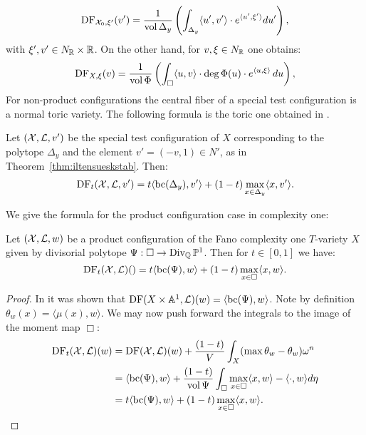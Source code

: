 \begin{equation}
\mathop{\rm DF}\nolimits_{{\mathcal{X}}_0, \xi'}(v') = \frac{1}{\mathop{\rm vol}\nolimits \Delta_y}\left(\int_{\Delta_y} \langle u', v' \rangle \cdot e^{\langle u', \xi'\rangle} du'\right),\label{eq:futaki-character}
\end{equation}
with $\xi',v' \in N_{\mathbb{R}} \times \mathbb{R}$. On the other hand, for $v,\xi \in N_{\mathbb{R}}$ one obtains:
\begin{equation}
\mathop{\rm DF}\nolimits_{X, \xi}(v) = \frac{1}{\mathop{\rm vol}\nolimits \Phi }\left(\int_{\Box} \langle u, v \rangle \cdot \deg \Phi(u) \cdot e^{\langle u, \xi \rangle}\, du\right)
, \label{eq:futaki-general-fibre}
\end{equation}
For non-product configurations the central fiber of a special test configuration is a normal toric variety. The following formula is the toric one obtained in \cite{datar2016kahler}.
\begin{lemma} Let \(({\mathcal{X}},\mathcal{L},v')\) be the special test configuration of \(X\) corresponding to the polytope \(\Delta_y\) and the element \(v' = (-v,1) \in N'\), as in Theorem~\ref{thm:iltensueskstab}. Then:
\[
\mathop{\rm DF}\nolimits_t( {\mathcal{X}}, \mathcal{L},v')  = t \langle \mathop{\rm bc}\nolimits(\Delta_y), v' \rangle + (1-t) \max_{x \in \Delta_y} \langle x, v' \rangle.
\]
\end{lemma}
We give the formula for the product configuration case in complexity one:
\begin{lemma}
Let \(({\mathcal{X}},\mathcal{L},w)\) be a product configuration of the Fano complexity one \(T\)-variety \(X\) given by divisorial polytope \(\Psi: \Box \to \operatorname{Div}_{\mathbb{Q}} \mathbb{P}^1\). Then for \(t \in [0,1]\) we have:
\[
\mathop{\rm DF}\nolimits_t({\mathcal{X}},\mathcal{L})() = t \langle  \mathop{\rm bc}\nolimits(\Psi), w \rangle + (1-t)\max_{x \in \Box} \langle x,w \rangle.
\]
\end{lemma}
\begin{proof}
In \cite{ilten2015} it was shown that \(\mathop{\rm DF}\nolimits(X \times \mathbb{A}^1,\mathcal{L})(w)  = \langle  \mathop{\rm bc}\nolimits(\Psi), w \rangle \). Note by definition \(\theta_w(x) = \langle \mu(x) , w \rangle\). We may now push forward the integrals to the image of the moment map \(\Box\):
\begin{align*}
\mathop{\rm DF}\nolimits_t({\mathcal{X}},\mathcal{L})(w) &=   \mathop{\rm DF}\nolimits({\mathcal{X}},\mathcal{L})(w) + \frac{(1-t)}{V} \int_{X} (\max \theta_w - \theta_w) \omega^n \\ &= \langle  \mathop{\rm bc}\nolimits(\Psi), w \rangle + \frac{(1-t)}{\mathop{\rm vol}\nolimits \Psi} \int_\Box \max_{x \in \Box} \langle x,w \rangle  - \langle \cdot, w \rangle d \eta \\
&= t \langle  \mathop{\rm bc}\nolimits(\Psi), w \rangle + (1-t)\max_{x \in \Box} \langle x,w \rangle.
\end{align*}
\end{proof}